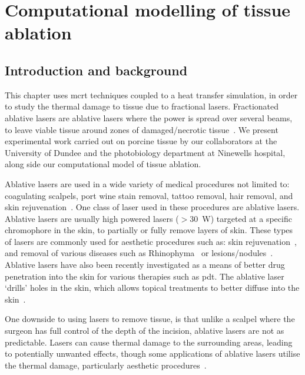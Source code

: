 \chapter{Computational modelling of tissue ablation}
\label{chap:ablation}
\section{Introduction and background}
\label{sec:intro}

This chapter uses \gls{mcrt} techniques coupled to a heat transfer simulation, in order to study the thermal damage to tissue due to fractional lasers. Fractionated ablative lasers  are ablative lasers where the power is spread over several beams, to leave viable tissue around zones of damaged/necrotic tissue~\cite{manstein2004fractional}. We present experimental work carried out on porcine tissue by our collaborators at the University of Dundee and the photobiology department at Ninewells hospital, along side our computational model of tissue ablation.

\medskip

Ablative lasers are used in a wide variety of medical procedures not limited to: coagulating scalpels, port wine stain removal, tattoo removal, hair removal, and skin rejuvenation~\cite{amini2010ultrafast, tan1989treatment,kuperman2001laser,liew2002laser,hardaway2002nonablative}.
One class of laser used in these procedures are ablative lasers. Ablative lasers are usually high powered lasers ($>$30~W) targeted at a specific chromophore in the skin, to partially or fully remove layers of skin. These types of lasers are commonly used for aesthetic procedures such as: skin rejuvenation~\cite{hardaway2002nonablative}, and removal of various diseases such as Rhinophyma~\cite{shapshay1980removal} or lesions/nodules~\cite{valcavi2010percutaneous}. Ablative lasers have also been recently investigated as a means of better drug penetration into the skin for various therapies such as \gls{pdt}. The ablative laser `drills' holes in the skin, which allows topical treatments to better diffuse into the skin~\cite{haedersdal2010fractional}.

One downside to using lasers to remove tissue, is that unlike a scalpel where the surgeon has full control of the depth of the incision, ablative lasers are not as predictable. Lasers can cause thermal damage to the surrounding areas, leading to potentially  unwanted effects, though some applications of ablative lasers utilise the thermal damage, particularly aesthetic procedures~\cite{alexiades2008spectrum}.

